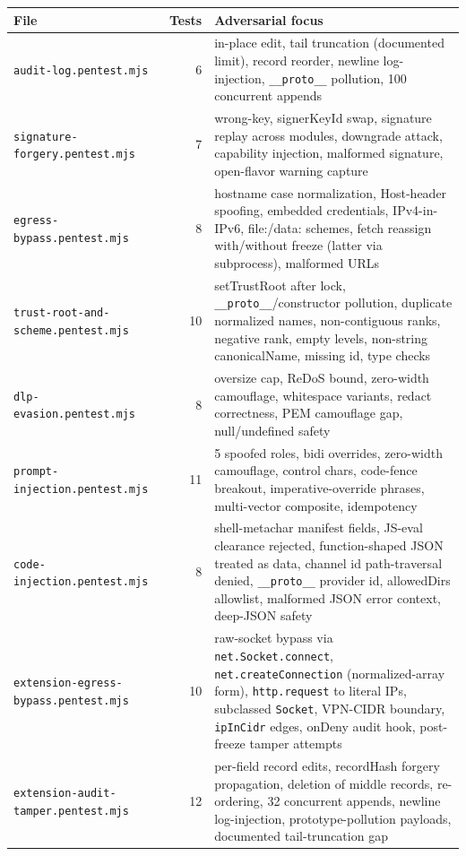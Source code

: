 \documentclass[11pt]{article}
\begin{document}
\begin{table}[t]
  \centering
  \small
  \begin{tabular}{|l|r|p{7cm}|}
    \hline
    \textbf{File} & \textbf{Tests} & \textbf{Adversarial focus} \\
    \hline
    \texttt{audit-log.pentest.mjs}        & 6  & in-place edit, tail truncation (documented limit), record reorder, newline log-injection, \texttt{\_\_proto\_\_} pollution, 100 concurrent appends \\
    \hline
    \texttt{signature-forgery.pentest.mjs} & 7  & wrong-key, signerKeyId swap, signature replay across modules, downgrade attack, capability injection, malformed signature, open-flavor warning capture \\
    \hline
    \texttt{egress-bypass.pentest.mjs}    & 8  & hostname case normalization, Host-header spoofing, embedded credentials, IPv4-in-IPv6, file:/data: schemes, fetch reassign with/without freeze (latter via subprocess), malformed URLs \\
    \hline
    \texttt{trust-root-and-scheme.pentest.mjs} & 10 & setTrustRoot after lock, \texttt{\_\_proto\_\_}/constructor pollution, duplicate normalized names, non-contiguous ranks, negative rank, empty levels, non-string canonicalName, missing id, type checks \\
    \hline
    \texttt{dlp-evasion.pentest.mjs}      & 8  & oversize cap, ReDoS bound, zero-width camouflage, whitespace variants, redact correctness, PEM camouflage gap, null/undefined safety \\
    \hline
    \texttt{prompt-injection.pentest.mjs} & 11 & 5 spoofed roles, bidi overrides, zero-width camouflage, control chars, code-fence breakout, imperative-override phrases, multi-vector composite, idempotency \\
    \hline
    \texttt{code-injection.pentest.mjs}   & 8  & shell-metachar manifest fields, JS-eval clearance rejected, function-shaped JSON treated as data, channel id path-traversal denied, \texttt{\_\_proto\_\_} provider id, allowedDirs allowlist, malformed JSON error context, deep-JSON safety \\
    \hline
    \texttt{extension-egress-bypass.pentest.mjs} & 10 & raw-socket bypass via \texttt{net.Socket.connect}, \texttt{net.createConnection} (normalized-array form), \texttt{http.request} to literal IPs, subclassed \texttt{Socket}, VPN-CIDR boundary, \texttt{ipInCidr} edges, onDeny audit hook, post-freeze tamper attempts \\
    \hline
    \texttt{extension-audit-tamper.pentest.mjs} & 12 & per-field record edits, recordHash forgery propagation, deletion of middle records, re-ordering, 32 concurrent appends, newline log-injection, prototype-pollution payloads, documented tail-truncation gap \\

\end{tabular}
\end{table}
\end{document}
